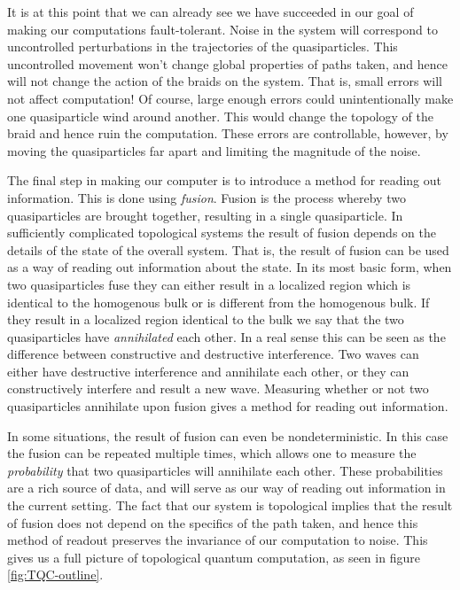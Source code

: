 \documentclass{article}
\theoremstyle{definition}
\numberwithin{figure}{section}
\begin{document}
It is at this point that we can already see we have succeeded in our goal of making our computations fault-tolerant. Noise in the system will correspond to uncontrolled perturbations in the trajectories of the quasiparticles. This uncontrolled movement won’t change global properties of paths taken, and hence will not change the action of the braids on the system. That is, small errors will not affect computation! Of course, large enough errors could unintentionally make one quasiparticle wind around another. This would change the topology of the braid and hence ruin the computation. These errors are controllable, however, by moving the quasiparticles far apart and limiting the magnitude of the noise.

The final step in making our computer is to introduce a method for reading out information. This is done using \textit{fusion}. Fusion is the process whereby two quasiparticles are brought together, resulting in a single quasiparticle. In sufficiently complicated topological systems the result of fusion depends on the details of the state of the overall system. That is, the result of fusion can be used as a way of reading out information about the state. In its most basic form, when two quasiparticles fuse they can either result in a localized region which is identical to the homogenous bulk or is different from the homogenous bulk. If they result in a localized region identical to the bulk we say that the two quasiparticles have \textit{annihilated} each other. In a real sense this can be seen as the difference between constructive and destructive interference. Two waves can either have destructive interference and annihilate each other, or they can constructively interfere and result a new wave. Measuring whether or not two quasiparticles annihilate upon fusion gives a method for reading out information.

In some situations, the result of fusion can even be nondeterministic. In this case the fusion can be repeated multiple times, which allows one to measure the \textit{probability} that two quasiparticles will annihilate each other. These probabilities are a rich source of data, and will serve as our way of reading out information in the current setting. The fact that our system is topological implies that the result of fusion does not depend on the specifics of the path taken, and hence this method of readout preserves the invariance of our computation to noise. This gives us a full picture of topological quantum computation, as seen in figure \ref{fig:TQC-outline}.
\end{document}
